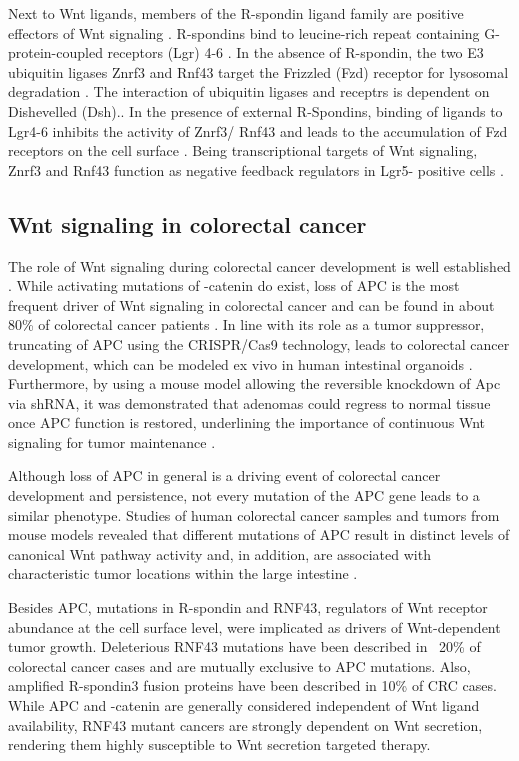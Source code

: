 \begin{flushleft}
Next to Wnt ligands, members of the R-spondin ligand family are positive effectors of Wnt signaling \cite{Kazanskaya2004, Glinka2011, Hao2012}. R-spondins bind to leucine-rich repeat containing G-protein-coupled receptors (Lgr) 4-6 \cite{Koo2012a}. In the absence of R-spondin, the two E3 ubiquitin ligases Znrf3 and Rnf43 target the Frizzled (Fzd) receptor for lysosomal degradation \cite{DeLau2011}. The interaction of ubiquitin ligases and receptrs is dependent on Dishevelled (Dsh).\cite{Jiang2015}. In the presence of external R-Spondins, binding of ligands to Lgr4-6 inhibits the activity of Znrf3/ Rnf43 and leads to the accumulation of Fzd receptors on the cell surface \cite{Hao2012, Koo2012a}. Being transcriptional targets of Wnt signaling, Znrf3 and Rnf43 function as negative feedback regulators in Lgr5- positive cells \cite{DeLau2012}. \par 

\subsection{Wnt signaling in colorectal cancer}
The role of Wnt signaling during colorectal cancer development is well established \cite{Polakis2007}. While activating mutations of \textbeta-catenin do exist, loss of APC is the most frequent driver of Wnt signaling in colorectal cancer and can be found in about 80\% of colorectal cancer patients \cite{Fearon1989}. In line with its role as a tumor suppressor, truncating of APC using the CRISPR/Cas9 technology, leads to colorectal cancer development, which can be modeled ex vivo in human intestinal organoids \cite{Matano2015, Drost2015SequentialCells}. Furthermore, by using a mouse model allowing the reversible knockdown of Apc via shRNA, it was demonstrated that adenomas could regress to normal tissue once APC function is restored, underlining the importance of continuous Wnt signaling for tumor maintenance \cite{Dow2015}. \par
Although loss of APC in general is a driving event of colorectal cancer development and persistence, not every mutation of the APC gene leads to a similar phenotype. Studies of human colorectal cancer samples and tumors from mouse models revealed that different mutations of APC result in distinct levels of canonical Wnt pathway activity and, in addition, are associated with characteristic tumor locations within the large intestine \cite{Christie2013, Buchert2010}. \par

Besides APC, mutations in R-spondin and RNF43, regulators of Wnt receptor abundance at the cell surface level, 
were implicated as drivers of Wnt-dependent tumor growth. Deleterious RNF43 mutations have been described in ~20\% of colorectal cancer cases and are mutually exclusive to APC mutations. Also, amplified R-spondin3 fusion proteins have been described in 10\% of CRC cases. While APC and \textbeta-catenin are generally considered independent of Wnt ligand availability, RNF43 mutant cancers are strongly dependent on Wnt secretion, rendering them highly susceptible to Wnt secretion targeted therapy.


\end{flushleft}
